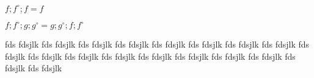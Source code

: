 \documentclass[12pt]{ociamthesis}  %
\begin{document}
\hfil
\begin{minipage}{12cm}
\begin{multicols}{2}
\begin{enumerate}[label={\bf [INV.\arabic*]}, ref={\bf [INV.\arabic*]}]
\item $f; f^\circ ; f = f$
\label{INV.1}
\item $f ; f ^\circ ;g; g^\circ = g;g^\circ ; f; f ^\circ $
\label{INV.2}
\end{enumerate}
\end{multicols}
\end{minipage}

fds fdsjlk
fds fdsjlk
fds fdsjlk
fds fdsjlk
fds fdsjlk
fds fdsjlk
fds fdsjlk
fds fdsjlk
fds fdsjlk
fds fdsjlk
fds fdsjlk
fds fdsjlk
fds fdsjlk
fds fdsjlk
fds fdsjlk
fds fdsjlk
fds fdsjlk
fds fdsjlk



\end{document}

